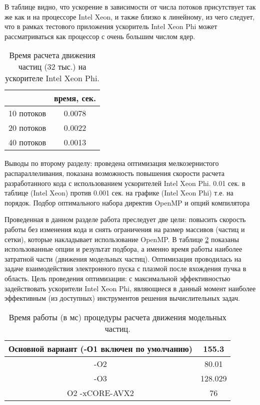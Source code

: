 В таблице видно, что ускорение в зависимости от числа потоков присутствует так же как и на процессоре Intel Xeon, и также близко к линейному, из чего следует, что в рамках тестового приложения ускоритель Intel Xeon Phi может рассматриваться как процессор с очень большим числом ядер.


\begin{table} [htbp]
	\centering
	\changecaptionwidth\captionwidth{15cm}
	\caption{Время расчета движения частиц (32 тыс.) на ускорителе Intel Xeon Phi.}
	\label{tabXeon}%
	\begin{tabular}{| c | c |}
		\hline
		            & время, сек.  \\ \hline
		10 потоков  & 0.0078    \\ \hline
		20 потоков  & 0.0022      \\ \hline
		40 потоков  & 0.0013        \\ \hline
	\end{tabular}
\end{table}


Выводы по второму разделу: проведена оптимизация мелкозернистого распараллеливания, показана возможность повышения скорости расчета разработанного кода с использованием ускорителей Intel Xeon Phi. 0.01 сек. в таблице (Intel Xeon) против 0.001 сек. на графике (Intel Xeon Phi) т.е. на порядок.
Подбор оптимального набора директив OpenMP и опций компилятора

Проведенная в данном разделе работа преследует две цели: повысить скорость работы без изменения кода и снять ограничения на размер массивов (частиц и сетки), которые накладывает использование OpenMP. В таблице \ref{tabOMPoptions} показаны использованные опции и результат подбора, а именно время работы наиболее затратной части (движения модельных частиц).  Оптимизация проводилась на задаче взаимодействия электронного пуска с плазмой после вхождения пучка в область. Цель проведения оптимизации: с максимальной эффективностью задействовать ускорители Intel Xeon Phi, являющиеся в данный момент наиболее эффективным (из доступных) инструментов решения вычислительных задач.

\begin{table} [htbp]
	\centering
	\changecaptionwidth\captionwidth{15cm}
	\caption{Время работы (в мс) процедуры расчета движения модельных частиц.}\label{tabOMPoptions}%
	\begin{tabular}{| c | c |}
		\hline
	
		Основной вариант (-О1 включен по умолчанию)   &  155.3 \\ \hline
		-O2 &  80.01   \\ \hline
		-O3 &  128.029   \\ \hline
		O2 -xCORE-AVX2 & 76 \\ 
		\hline
	\end{tabular}
\end{table}



